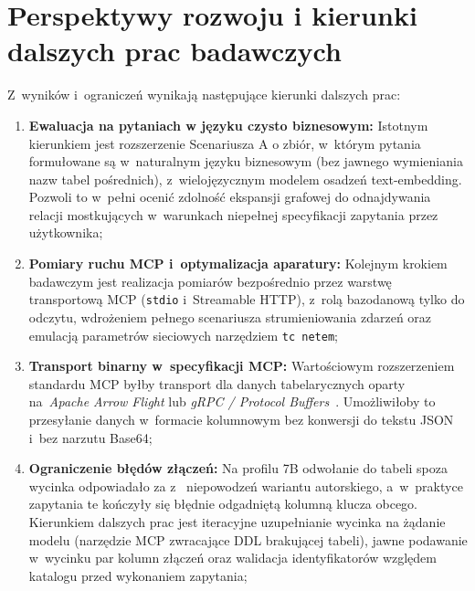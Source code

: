 \section{Perspektywy rozwoju i kierunki dalszych prac badawczych}
\label{sec:podsumowanie_kierunki}

Z~wyników i~ograniczeń wynikają następujące kierunki dalszych prac:
\begin{enumerate}
    \item \textbf{Ewaluacja na pytaniach w języku czysto biznesowym:}
    Istotnym kierunkiem jest rozszerzenie Scenariusza A o zbiór, w~którym pytania formułowane są w~naturalnym języku biznesowym (bez jawnego wymieniania nazw tabel pośrednich), z~wielojęzycznym modelem osadzeń text-embedding. Pozwoli to w~pełni ocenić zdolność ekspansji grafowej do odnajdywania relacji mostkujących w~warunkach niepełnej specyfikacji zapytania przez użytkownika;

    \item \textbf{Pomiary ruchu MCP i~optymalizacja aparatury:}
    Kolejnym krokiem badawczym jest realizacja pomiarów bezpośrednio przez warstwę transportową MCP (\texttt{stdio} i~Streamable HTTP), z~rolą bazodanową tylko do odczytu, wdrożeniem pełnego scenariusza strumieniowania zdarzeń oraz emulacją parametrów sieciowych narzędziem \texttt{tc netem};

    \item \textbf{Transport binarny w~specyfikacji MCP:}
    Wartościowym rozszerzeniem standardu MCP byłby transport dla danych tabelarycznych oparty na~\emph{Apache Arrow Flight} lub \emph{gRPC / Protocol Buffers}~\cite{grpc_spec,protobuf_spec}. Umożliwiłoby to przesyłanie danych w~formacie kolumnowym bez konwersji do tekstu JSON i~bez narzutu Base64;
    
    \item \textbf{Ograniczenie błędów złączeń:}
    Na profilu 7B odwołanie do tabeli spoza wycinka odpowiadało za \wynErrTableMissingLarge{} z~\wynErrFalseLarge{} niepowodzeń wariantu autorskiego, a~w~praktyce zapytania te kończyły się błędnie odgadniętą kolumną klucza obcego. Kierunkiem dalszych prac jest iteracyjne uzupełnianie wycinka na żądanie modelu (narzędzie MCP zwracające DDL brakującej tabeli), jawne podawanie w~wycinku par kolumn złączeń oraz walidacja identyfikatorów względem katalogu przed wykonaniem zapytania;


\end{enumerate}
